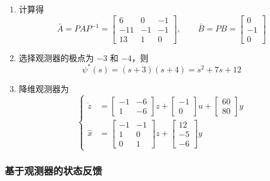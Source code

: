 \begin{example}
\begin{enumerate}[label=\textbf{第 \arabic* 步.}, leftmargin=*]
        \item 计算得
        \[
        \bar{A}=PAP^{-1}
        =
        \begin{bmatrix}
        6 & 0 & -1\\
        -11 & -1 & -1\\
        13 & 1 & 0
        \end{bmatrix},
        \qquad
        \bar{B}=PB=
        \begin{bmatrix}
        0\\-1\\0
        \end{bmatrix}
        \]

        \item 选择观测器的极点为 $-3$ 和 $-4$，则
        \[
        \psi^*(s)=(s+3)(s+4)=s^2+7s+12
        \]

        \item 降维观测器为
        \[
        \left\{
        \begin{aligned}
        \dot{z}
        &=
        \begin{bmatrix}
        -1 & -6\\
        1 & -6
        \end{bmatrix}z
        +
        \begin{bmatrix}
        -1\\0
        \end{bmatrix}u
        +
        \begin{bmatrix}
        60\\80
        \end{bmatrix}y
        \\
        \hat{x}
        &=
        \begin{bmatrix}
        -1 & -1\\
        1 & 0\\
        0 & 1
        \end{bmatrix}z
        +
        \begin{bmatrix}
        12\\-5\\-6
        \end{bmatrix}y
        \end{aligned}
        \right.
        \]
    \end{enumerate}
\end{example}

\subsubsection{基于观测器的状态反馈}

